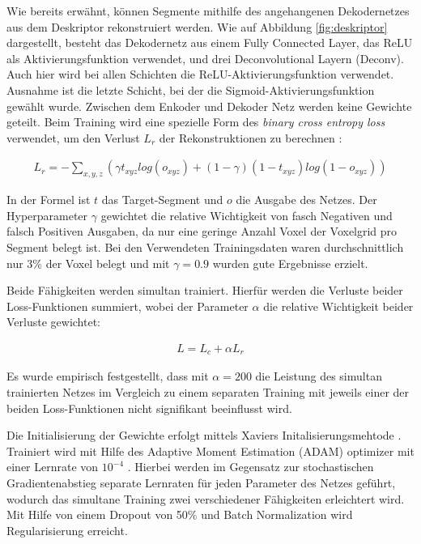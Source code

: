 Wie bereits erwähnt, können Segmente mithilfe des angehangenen Dekodernetzes aus dem Deskriptor rekonstruiert werden. Wie auf Abbildung \ref{fig:deskriptor} dargestellt, besteht das Dekodernetz aus einem Fully Connected Layer, das ReLU als Aktivierungsfunktion verwendet, und drei Deconvolutional Layern (Deconv). Auch hier wird bei allen Schichten die ReLU-Aktivierungsfunktion verwendet. Ausnahme ist die letzte Schicht, bei der die Sigmoid-Aktivierungsfunktion gewählt wurde. Zwischen dem Enkoder und Dekoder Netz werden keine Gewichte geteilt. Beim Training wird eine spezielle Form des \textit{binary cross entropy loss} verwendet, um den Verlust $ L_r $ der Rekonstruktionen zu berechnen \cite{Brock2016}: 

\begin{align}
	L_r = -\sum_{x,y,z}(\gamma t_{xyz}log(o_{xyz}) + (1 - \gamma)(1 - t_{xyz})log(1 - o_{xyz}))
\end{align}
 
In der Formel ist $ t $ das Target-Segment und $ o $ die Ausgabe des Netzes. Der Hyperparameter $ \gamma $ gewichtet die  relative Wichtigkeit von fasch Negativen und falsch Positiven Ausgaben, da nur eine geringe Anzahl Voxel der Voxelgrid pro Segment belegt ist. Bei den Verwendeten Trainingsdaten waren durchschnittlich nur 3\% der Voxel belegt und mit $ \gamma = 0.9 $ wurden gute Ergebnisse erzielt. 

Beide Fähigkeiten werden simultan trainiert. Hierfür werden die Verluste beider Loss-Funktionen summiert, wobei der Parameter $ \alpha $ die relative Wichtigkeit beider Verluste gewichtet: 

\begin{align}
	L = L_c + \alpha L_r
\end{align}

Es wurde empirisch festgestellt, dass mit $ \alpha = 200 $ die Leistung des simultan trainierten Netzes im Vergleich zu einem separaten Training mit jeweils einer der beiden Loss-Funktionen nicht signifikant beeinflusst wird. 

Die Initialisierung der Gewichte erfolgt mittels Xaviers Initalisierungsmehtode \linebreak \cite{Glorot2010}.
Trainiert wird mit Hilfe des Adaptive Moment Estimation (ADAM) optimizer mit einer Lernrate von $ 10^{-4} $ \cite{Kingma2014}.  Hierbei werden im Gegensatz zur stochastischen Gradientenabstieg separate Lernraten für jeden Parameter des Netzes geführt, wodurch das simultane Training zwei verschiedener Fähigkeiten erleichtert wird. Mit Hilfe von einem Dropout von 50\% und Batch Normalization wird Regularisierung erreicht. 

